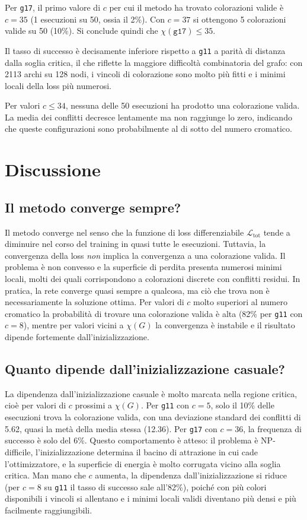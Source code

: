 \documentclass{article}
\begin{document}
Per \texttt{g17}, il primo valore di $c$ per cui il metodo ha trovato colorazioni valide
è $c = 35$ (1 esecuzioni su 50, ossia il 2\%). Con $c = 37$ si ottengono 5 colorazioni
valide su 50 (10\%). Si conclude quindi che $\chi(\texttt{g17}) \leq 35$.

Il tasso di successo è decisamente inferiore rispetto a \texttt{g11} a parità di distanza
dalla soglia critica, il che riflette la maggiore difficoltà combinatoria del grafo: con
2113 archi su 128 nodi, i vincoli di colorazione sono molto più fitti e i minimi locali
della loss più numerosi.

Per valori $c \leq 34$, nessuna delle 50 esecuzioni ha prodotto una colorazione valida.
La media dei conflitti decresce lentamente ma non raggiunge lo zero, indicando che queste
configurazioni sono probabilmente al di sotto del numero cromatico. 
\section{Discussione}

\subsection*{Il metodo converge sempre?}

Il metodo converge nel senso che la funzione di loss differenziabile
$\mathcal{L}_{\mathrm{tot}}$ tende a diminuire nel corso del training in quasi tutte le
esecuzioni. Tuttavia, la convergenza della loss \emph{non} implica la convergenza a una
colorazione valida. Il problema è non convesso e la superficie di perdita presenta numerosi
minimi locali, molti dei quali corrispondono a colorazioni discrete con conflitti residui.
In pratica, la rete converge quasi sempre a qualcosa, ma ciò che trova non è necessariamente
la soluzione ottima. Per valori di $c$ molto superiori al numero cromatico la probabilità
di trovare una colorazione valida è alta (82\% per \texttt{g11} con $c = 8$), mentre per
valori vicini a $\chi(G)$ la convergenza è instabile e il risultato dipende fortemente
dall'inizializzazione.

\subsection*{Quanto dipende dall'inizializzazione casuale?}

La dipendenza dall'inizializzazione casuale è molto marcata nella regione critica, cioè
per valori di $c$ prossimi a $\chi(G)$. Per \texttt{g11} con $c = 5$, solo il 10\% delle
esecuzioni trova la colorazione valida, con una deviazione standard dei conflitti di 5.62,
quasi la metà della media stessa (12.36). Per \texttt{g17} con $c = 36$, la frequenza di
successo è solo del 6\%. Questo comportamento è atteso: il problema è NP-difficile,
l'inizializzazione determina il bacino di attrazione in cui cade l'ottimizzatore, e la
superficie di energia è molto corrugata vicino alla soglia critica. Man mano che $c$
aumenta, la dipendenza dall'inizializzazione si riduce (per $c = 8$ su \texttt{g11} il
tasso di successo sale all'82\%), poiché con più colori disponibili i vincoli si allentano
e i minimi locali validi diventano più densi e più facilmente raggiungibili.
\end{document}
